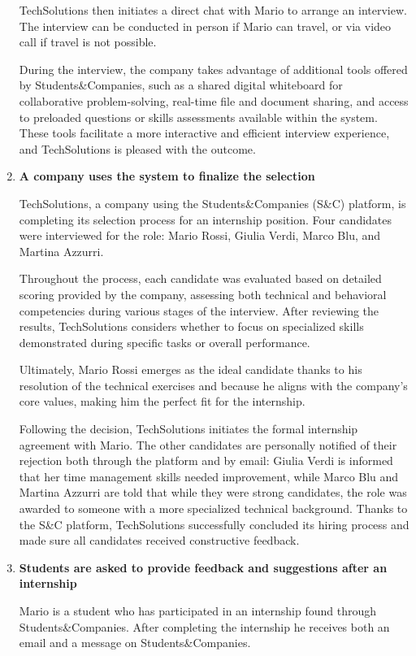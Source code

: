 \begin{enumerate}
    TechSolutions then initiates a direct chat with Mario to arrange an interview. The interview can be conducted in person if Mario can travel, or via video call if travel is not possible.

    During the interview, the company takes advantage of additional tools offered by Students\&Companies, such as a shared digital whiteboard for collaborative problem-solving, real-time file and document sharing, and access to preloaded questions or skills assessments available within the system. These tools facilitate a more interactive and efficient interview experience, and TechSolutions is pleased with the outcome.

    \item \textbf{A company uses the system to finalize the selection}
    
    TechSolutions, a company using the Students\&Companies (S\&C) platform, is completing its selection process for an internship position. Four candidates were interviewed for the role: Mario Rossi, Giulia Verdi, Marco Blu, and Martina Azzurri.

    Throughout the process, each candidate was evaluated based on detailed scoring provided by the company, assessing both technical and behavioral competencies during various stages of the interview. After reviewing the results, TechSolutions considers whether to focus on specialized skills demonstrated during specific tasks or overall performance.

    Ultimately, Mario Rossi emerges as the ideal candidate thanks to his resolution of the technical exercises and because he aligns with the company's core values, making him the perfect fit for the internship.

    Following the decision, TechSolutions initiates the formal internship agreement with Mario. The other candidates are personally notified of their rejection both through the platform and by email: Giulia Verdi is informed that her time management skills needed improvement, while Marco Blu and Martina Azzurri are told that while they were strong candidates, the role was awarded to someone with a more specialized technical background.
    Thanks to the S\&C platform, TechSolutions successfully concluded its hiring process and made sure all candidates received constructive feedback.

    \item \textbf{Students are asked to provide feedback and suggestions after an internship}

    Mario is a student who has participated in an internship found through Students\&Companies. After completing the internship he receives both an email and a message on Students\&Companies.


\end{enumerate}
